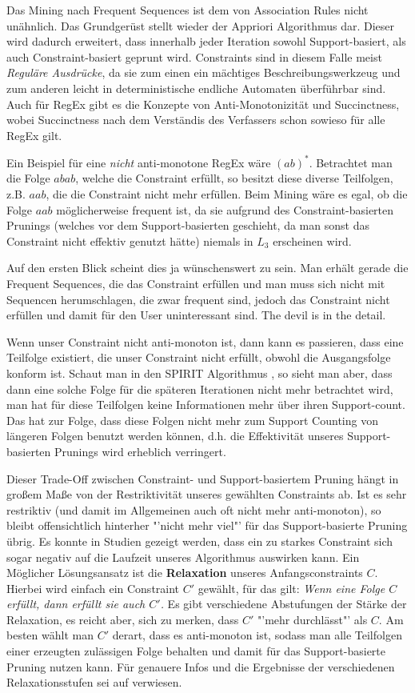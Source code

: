 Das Mining nach Frequent Sequences ist dem von Association Rules nicht unähnlich.
Das Grundgerüst stellt wieder der Appriori Algorithmus dar. Dieser wird dadurch
erweitert, dass innerhalb jeder Iteration sowohl Support-basiert, als auch
Constraint-basiert geprunt wird. Constraints sind in diesem Falle meist 
\textit{Reguläre Ausdrücke}, da sie zum einen ein mächtiges Beschreibungswerkzeug
und zum anderen leicht in deterministische endliche Automaten überführbar sind.
Auch für  RegEx gibt es die Konzepte von Anti-Monotonizität und Succinctness, wobei
Succinctness nach dem Verständis des Verfassers schon sowieso für alle RegEx gilt.

Ein Beispiel für eine \textit{nicht} anti-monotone RegEx wäre \((ab)^*\). Betrachtet
man die Folge \(abab\), welche die Constraint erfüllt, so besitzt diese diverse 
Teilfolgen, z.B. \(aab\), die die Constraint nicht mehr erfüllen. Beim Mining
wäre es egal, ob die Folge \(aab\) möglicherweise frequent ist, da sie aufgrund
des Constraint-basierten Prunings (welches vor dem Support-basierten geschieht,
da man sonst das Constraint nicht effektiv genutzt hätte) niemals in \(L_3\)
erscheinen wird. 

Auf den ersten Blick scheint dies ja wünschenswert zu sein.
Man erhält gerade die Frequent Sequences, die das Constraint erfüllen und man
muss sich nicht mit Sequencen herumschlagen, die zwar frequent sind, jedoch das
Constraint nicht erfüllen und damit für den User uninteressant sind. The devil
is in the detail.

Wenn unser Constraint nicht anti-monoton ist, dann kann es passieren, dass eine
Teilfolge existiert, die unser Constraint nicht erfüllt, obwohl die Ausgangsfolge
konform ist. Schaut man in den SPIRIT Algorithmus \citep{Garofalakis99}, so sieht man aber, dass dann
eine solche Folge für die späteren Iterationen nicht mehr betrachtet wird, man hat
für diese Teilfolgen keine Informationen mehr über ihren Support-count. Das hat
zur Folge, dass diese Folgen nicht mehr zum Support Counting von längeren Folgen
benutzt werden können, d.h. die Effektivität unseres Support-basierten Prunings
wird erheblich verringert. 

Dieser Trade-Off zwischen Constraint- und Support-basiertem Pruning hängt in
großem Maße von der Restriktivität unseres gewählten Constraints ab. Ist es sehr
restriktiv (und damit im Allgemeinen auch oft nicht mehr anti-monoton), so bleibt
offensichtlich hinterher "'nicht mehr viel"' für das Support-basierte Pruning übrig.
Es konnte in Studien gezeigt werden, dass ein zu starkes Constraint sich sogar negativ
auf die Laufzeit unseres Algorithmus auswirken kann. Ein Möglicher Lösungsansatz
ist die \textbf{Relaxation} unseres Anfangsconstraints \(C\). Hierbei wird einfach ein
Constraint \(C'\) gewählt, für das gilt:\textit{ Wenn eine Folge \(C\) erfüllt, dann erfüllt
sie auch \(C'\).} Es gibt verschiedene Abstufungen der Stärke der Relaxation, es
reicht aber, sich zu merken, dass \(C'\) "'mehr durchlässt"' als \(C\). Am besten
wählt man \(C'\) derart, dass es anti-monoton ist, sodass man alle Teilfolgen einer
erzeugten zulässigen Folge behalten und damit für das Support-basierte Pruning nutzen
kann. Für genauere Infos und die Ergebnisse der verschiedenen Relaxationsstufen sei
auf \citet{Garofalakis99} verwiesen.
